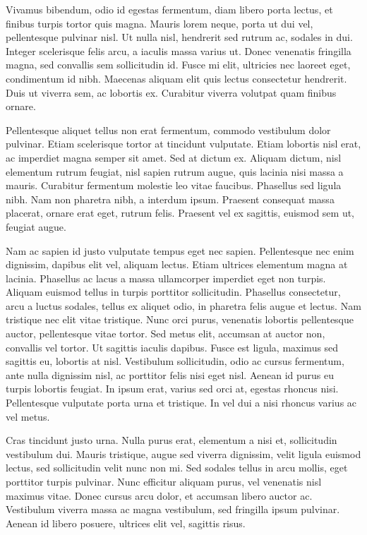 \documentclass[sigconf]{acmart} %
\begin{document}
Vivamus bibendum, odio id egestas fermentum, diam libero porta lectus, et finibus turpis tortor quis magna. Mauris lorem neque, porta ut dui vel, pellentesque pulvinar nisl. Ut nulla nisl, hendrerit sed rutrum ac, sodales in dui. Integer scelerisque felis arcu, a iaculis massa varius ut. Donec venenatis fringilla magna, sed convallis sem sollicitudin id. Fusce mi elit, ultricies nec laoreet eget, condimentum id nibh. Maecenas aliquam elit quis lectus consectetur hendrerit. Duis ut viverra sem, ac lobortis ex. Curabitur viverra volutpat quam finibus ornare.

Pellentesque aliquet tellus non erat fermentum, commodo vestibulum dolor pulvinar. Etiam scelerisque tortor at tincidunt vulputate. Etiam lobortis nisl erat, ac imperdiet magna semper sit amet. Sed at dictum ex. Aliquam dictum, nisl elementum rutrum feugiat, nisl sapien rutrum augue, quis lacinia nisi massa a mauris. Curabitur fermentum molestie leo vitae faucibus. Phasellus sed ligula nibh. Nam non pharetra nibh, a interdum ipsum. Praesent consequat massa placerat, ornare erat eget, rutrum felis. Praesent vel ex sagittis, euismod sem ut, feugiat augue.

Nam ac sapien id justo vulputate tempus eget nec sapien. Pellentesque nec enim dignissim, dapibus elit vel, aliquam lectus. Etiam ultrices elementum magna at lacinia. Phasellus ac lacus a massa ullamcorper imperdiet eget non turpis. Aliquam euismod tellus in turpis porttitor sollicitudin. Phasellus consectetur, arcu a luctus sodales, tellus ex aliquet odio, in pharetra felis augue et lectus. Nam tristique nec elit vitae tristique. Nunc orci purus, venenatis lobortis pellentesque auctor, pellentesque vitae tortor. Sed metus elit, accumsan at auctor non, convallis vel tortor. Ut sagittis iaculis dapibus. Fusce est ligula, maximus sed sagittis eu, lobortis at nisl. Vestibulum sollicitudin, odio ac cursus fermentum, ante nulla dignissim nisl, ac porttitor felis nisi eget nisl. Aenean id purus eu turpis lobortis feugiat. In ipsum erat, varius sed orci at, egestas rhoncus nisi. Pellentesque vulputate porta urna et tristique. In vel dui a nisi rhoncus varius ac vel metus.

Cras tincidunt justo urna. Nulla purus erat, elementum a nisi et, sollicitudin vestibulum dui. Mauris tristique, augue sed viverra dignissim, velit ligula euismod lectus, sed sollicitudin velit nunc non mi. Sed sodales tellus in arcu mollis, eget porttitor turpis pulvinar. Nunc efficitur aliquam purus, vel venenatis nisl maximus vitae. Donec cursus arcu dolor, et accumsan libero auctor ac. Vestibulum viverra massa ac magna vestibulum, sed fringilla ipsum pulvinar. Aenean id libero posuere, ultrices elit vel, sagittis risus.
\end{document}

